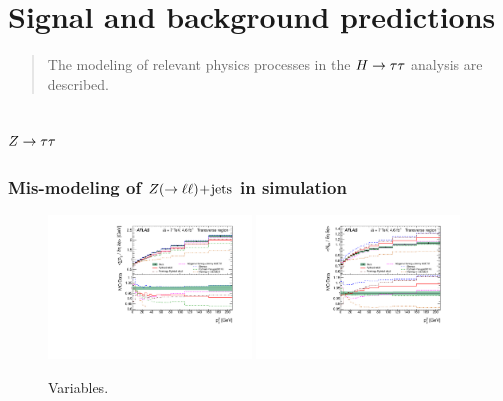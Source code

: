 \chapter[Signal and background predictions][Signal and background predictions]{Signal and background predictions}
\label{chap:backgrounds}

\begin{quote}
The modeling of relevant physics processes in the $H\rightarrow\tau\tau$ analysis are described.
\end{quote}

\section{$Z\rightarrow\tau\tau$}
\label{sec:backgrounds-ztautau}

\subsection{Mis-modeling of $Z (\rightarrow \ell\ell)\!+\!\text{jets}$ in simulation}

\begin{figure}[tp]
  \centering
  \includegraphics[width=0.48\textwidth]{figures/STDM-2011-42/fig_14b}
  \includegraphics[width=0.48\textwidth]{figures/STDM-2011-42/fig_17b}
  \caption{Variables.}
  \label{fig:backgrounds-zue}
\end{figure}


